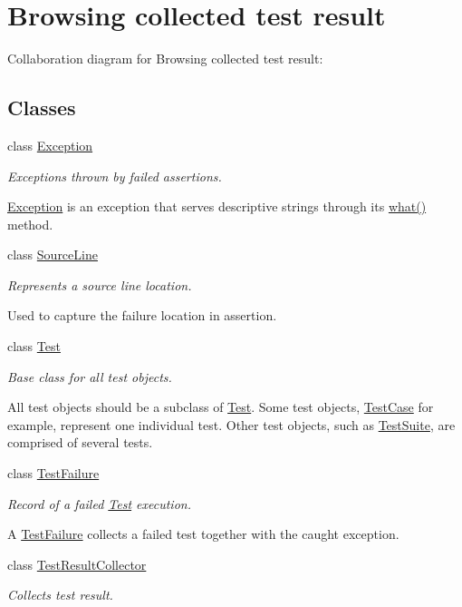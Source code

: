 \hypertarget{group___browsing_collected_test_result}{\section{Browsing collected test result}
\label{group___browsing_collected_test_result}
}
Collaboration diagram for Browsing collected test result\+:
\subsection*{Classes}
\begin{DoxyCompactItemize}
\item 
class \hyperlink{class_exception}{Exception}
\begin{DoxyCompactList}\small\item\em Exceptions thrown by failed assertions.

\hyperlink{class_exception}{Exception} is an exception that serves descriptive strings through its \hyperlink{class_exception_a380f0477d9ef319911e7a8167bd47f1f}{what()} method. \end{DoxyCompactList}\item 
class \hyperlink{class_source_line}{Source\+Line}
\begin{DoxyCompactList}\small\item\em Represents a source line location.

Used to capture the failure location in assertion. \end{DoxyCompactList}\item 
class \hyperlink{class_test}{Test}
\begin{DoxyCompactList}\small\item\em Base class for all test objects.

All test objects should be a subclass of \hyperlink{class_test}{Test}. Some test objects, \hyperlink{class_test_case}{Test\+Case} for example, represent one individual test. Other test objects, such as \hyperlink{class_test_suite}{Test\+Suite}, are comprised of several tests. \end{DoxyCompactList}\item 
class \hyperlink{class_test_failure}{Test\+Failure}
\begin{DoxyCompactList}\small\item\em Record of a failed \hyperlink{class_test}{Test} execution.

A \hyperlink{class_test_failure}{Test\+Failure} collects a failed test together with the caught exception. \end{DoxyCompactList}\item 
class \hyperlink{class_test_result_collector}{Test\+Result\+Collector}
\begin{DoxyCompactList}\small\item\em Collects test result.


\end{DoxyCompactList}
\end{DoxyCompactItemize}

